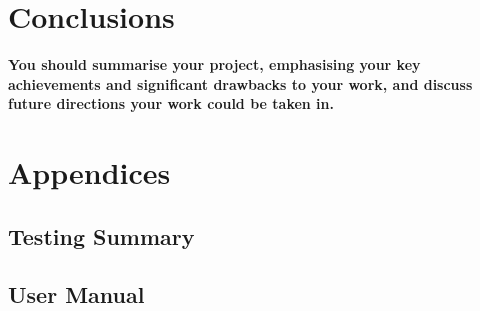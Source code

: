 \documentclass{article}
\begin{document}
\section{Conclusions}
\textbf{You should summarise your project, emphasising your
key achievements and significant drawbacks to your
work, and discuss future directions your work could be
taken in.}
\newpage


\newpage
\section*{Appendices}
\subsection*{Testing Summary}
\subsection*{User Manual}
\end{document}
